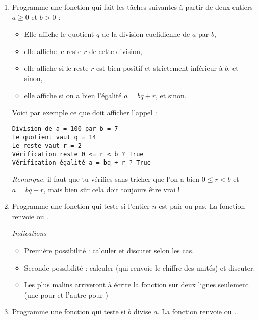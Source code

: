 \documentclass[11pt,class=report,crop=false]{standalone}
\begin{document}
\begin{activite}



\begin{enumerate}
  \item Programme une fonction  qui fait les tâches suivantes à partir de deux entiers $a\ge0$ et $b>0$ :
  \begin{itemize}
    \item Elle affiche le quotient $q$ de la division euclidienne de $a$ par $b$,
    \item elle affiche le reste $r$ de cette division,
    \item elle affiche  si le reste $r$ est bien positif et strictement inférieur à $b$, et  sinon,
    \item elle affiche  si on a bien l'égalité $a = bq+r$, et  sinon.
   \end{itemize}
    
Voici par exemple ce que doit afficher l'appel   :
\begin{lstlisting}  
Division de a = 100 par b = 7
Le quotient vaut q = 14
Le reste vaut r = 2
Vérification reste 0 <= r < b ? True
Vérification égalité a = bq + r ? True
\end{lstlisting}

\emph{Remarque.} il faut que tu vérifies sans tricher que l'on a bien $0 \le r<b$ et $a=bq+r$, mais bien sûr cela doit toujours être vrai !
  
  
  \item Programme une fonction  qui teste si l'entier $n$ est pair ou pas. La fonction renvoie   ou .
  
  \emph{Indications}
  \begin{itemize}
    \item Première possibilité : calculer  et discuter selon les cas.
    \item Seconde possibilité : calculer  (qui renvoie le chiffre des unités) et discuter.
    \item Les plus malins arriveront à écrire la fonction sur deux lignes seulement (une pour  et l'autre pour )
   \end{itemize}
   
  \item  Programme une fonction  qui teste si $b$ divise $a$. La fonction renvoie  ou .
  
\end{enumerate}   
     
\end{activite}
\end{document}
